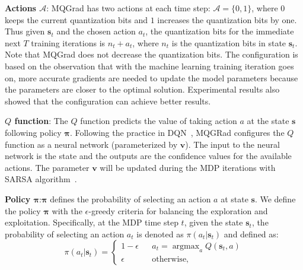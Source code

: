 \documentclass[sigconf]{acmart}
\begin{document}

\textbf{Actions $\mathcal{A}$}: MQGrad has two actions at each time step: $\mathcal{A} = \{0, 1\}$, where $0$ keeps the current quantization bits and $1$ increases the quantization bits by one. Thus given $\textbf{s}_t$ and the chosen action $a_t$, the quantization bits for the immediate next $T$ training iterations is $n_t + a_t$, where $n_t$ is the quantization bits in state $\textbf{s}_t$. Note that MQGrad does not decrease the quantization bits. The configuration is based on the observation that with the machine learning training iteration goes on, more accurate gradients are needed to update the model parameters because the parameters are closer to the optimal solution. Experimental results also showed that the configuration can achieve better results.


\textbf{$Q$ function}: The $Q$ function predicts the value of taking action $a$ at the state $\textbf{s}$ following policy $\bm\pi$. Following the practice in DQN~\cite{mnih2013playing}, MQGRad configures the $Q$ function as a neural network (parameterized by $\textbf{v}$). The input to the neural network is the state and the outputs are the confidence values for the available actions. The parameter $\textbf{v}$ will be updated during the MDP iterations with SARSA algorithm~\cite{sutton1998reinforcement}.


\textbf{Policy $\bm\pi$}:$\bm\pi$ defines the probability of selecting an action $a$ at state $\textbf{s}$. We define the policy $\bm\pi$ with the $\epsilon$-greedy criteria for balancing the exploration and exploitation. Specifically, at the MDP time step $t$, given the state $\textbf{s}_t$, the probability of selecting an action $a_t$ is denoted as $\pi(a_t|\textbf{s}_t)$ and defined as:
$$
	\pi(a_t|\textbf{s}_t) = \left\{
	\begin{array}{rcl}
		1 - \epsilon &  & a_t = \mathop{\arg \max}_a  Q(\textbf{s}_t, a) \\
		\epsilon     &  & \mathrm{otherwise},
	\end{array} \right.
$$
\end{document}
